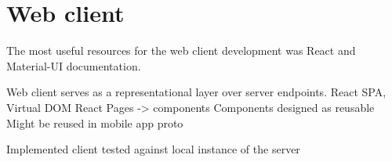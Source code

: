 
\section{Web client}\label{sec:web-client}

The most useful resources for the web client development was React and Material-UI documentation.\cite{react, material}

Web client serves as a representational layer over server endpoints.
React
SPA, Virtual DOM
React Pages -> components
Components designed as reusable
Might be reused in mobile app proto

Implemented client tested against local instance of the server

